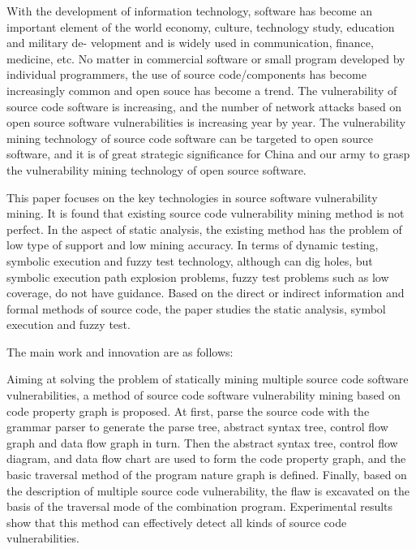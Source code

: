 \begin{eabstract}

With the development of information technology, software has become an important
element of the world economy, culture, technology study, education and military de-
velopment and is widely
used in communication, finance, medicine, etc. No matter in commercial software or small program developed by individual programmers, the use of source code/components has become increasingly common and open souce has become a trend. The vulnerability of source code software is increasing, and the number of network attacks based on open source software vulnerabilities is increasing year by year. The vulnerability mining technology of source code software can be targeted to open source software, and it is of great strategic significance for China and our army to grasp the vulnerability mining technology of open source software.

This paper focuses on the key technologies in source software vulnerability mining. It is found that existing source code vulnerability mining method is not perfect. In the aspect of static analysis, the existing method has the problem of low type of support and low mining accuracy. In terms of dynamic testing, symbolic execution and fuzzy test technology, although can dig holes, but symbolic execution path explosion problems, fuzzy test problems such as low coverage, do not have guidance. Based on the direct or indirect information and formal methods of source code, the paper studies the static analysis, symbol execution and fuzzy test.


The main work and innovation are as follows:

Aiming at solving the problem of statically mining multiple source code software vulnerabilities, a method of source code software vulnerability mining based on code property graph is proposed. At first, parse the source code with the grammar parser to generate the parse tree, abstract syntax tree, control flow graph and data flow graph in turn. Then the abstract syntax tree, control flow diagram, and data flow chart are used to form the code property graph, and the basic traversal method of the program nature graph is defined. Finally, based on the description of multiple source code vulnerability, the flaw is excavated on the basis of the traversal mode of the combination program. Experimental results show that this method can effectively detect all kinds of source code vulnerabilities.


\end{eabstract}
